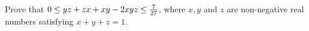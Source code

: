 Prove that $0\le yz+zx+xy-2xyz\le{7\over27}$,  where $x,y$ and $z$ are non-negative real numbers satisfying $x+y+z=1$.